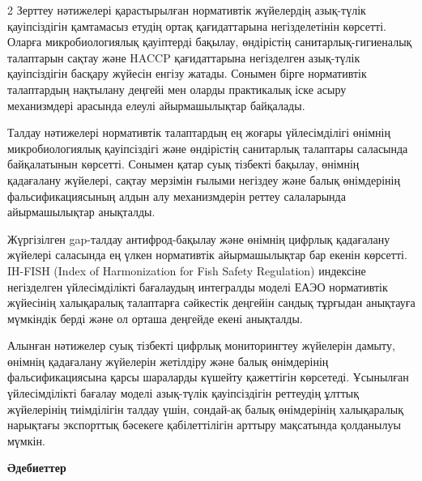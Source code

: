 \begin{multicols}{2}
Зерттеу нәтижелері қарастырылған нормативтік жүйелердің азық-түлік
қауіпсіздігін қамтамасыз етудің ортақ қағидаттарына негізделетінін
көрсетті. Оларға микробиологиялық қауіптерді бақылау, өндірістің
санитарлық-гигиеналық талаптарын сақтау және HACCP қағидаттарына
негізделген азық-түлік қауіпсіздігін басқару жүйесін енгізу жатады.
Сонымен бірге нормативтік талаптардың нақтылану деңгейі мен оларды
практикалық іске асыру механизмдері арасында елеулі айырмашылықтар
байқалады.

Талдау нәтижелері нормативтік талаптардың ең жоғары үйлесімділігі
өнімнің микробиологиялық қауіпсіздігі және өндірістің санитарлық
талаптары саласында байқалатынын көрсетті. Сонымен қатар суық тізбекті
бақылау, өнімнің қадағалану жүйелері, сақтау мерзімін ғылыми негіздеу
және балық өнімдерінің фальсификациясының алдын алу механизмдерін реттеу
салаларында айырмашылықтар анықталды.

Жүргізілген gap-талдау антифрод-бақылау және өнімнің цифрлық қадағалану
жүйелері саласында ең үлкен нормативтік айырмашылықтар бар екенін
көрсетті. IH-FISH (Index of Harmonization for Fish Safety Regulation)
индексіне негізделген үйлесімділікті бағалаудың интегралды моделі ЕАЭО
нормативтік жүйесінің халықаралық талаптарға сәйкестік деңгейін сандық
тұрғыдан анықтауға мүмкіндік берді және ол орташа деңгейде екені
анықталды.

Алынған нәтижелер суық тізбекті цифрлық мониторингтеу жүйелерін дамыту,
өнімнің қадағалану жүйелерін жетілдіру және балық өнімдерінің
фальсификациясына қарсы шараларды күшейту қажеттігін көрсетеді.
Ұсынылған үйлесімділікті бағалау моделі азық-түлік қауіпсіздігін
реттеудің ұлттық жүйелерінің тиімділігін талдау үшін, сондай-ақ балық
өнімдерінің халықаралық нарықтағы экспорттық бәсекеге қабілеттілігін
арттыру мақсатында қолданылуы мүмкін.
\end{multicols}

\begin{center}
{\bfseries Әдебиеттер}
\end{center}

